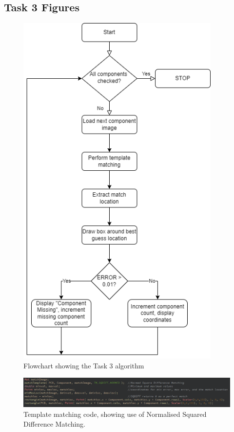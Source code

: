 \documentclass[conference]{IEEEtran}
\begin{document}
\subsection{Task 3 Figures}\label{app:T3}
\begin{figure}[H]
\centering
\includegraphics[width=4in]{Task3_flowchart}
\caption{Flowchart showing the Task 3 algorithm}
\label{fig:task2_flowchart}
\end{figure}

\begin{figure}[H]
\centering
\includegraphics[width=5in]{t3_code1}
\caption{Template matching code, showing use of Normalised Squared Difference Matching.}
\label{fig_t3code}
\end{figure}
\end{document}

